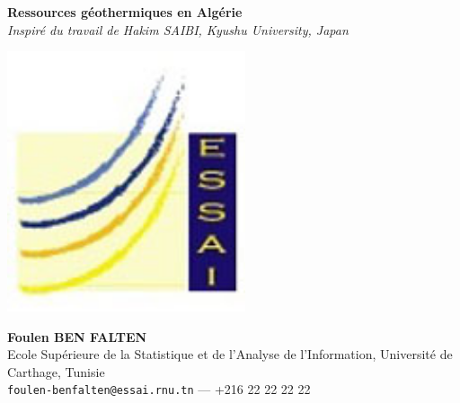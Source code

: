 \documentclass[a0, portrait]{a0poster}
\begin{document}


\begin{minipage}[b]{0.75\linewidth}
\VeryHuge \color{NavyBlue} \textbf{Ressources géothermiques en Algérie} \color{Black}\\[0.5cm]%
\Huge\textit{Inspiré du travail de Hakim SAIBI, Kyushu University, Japan}\\[0.5cm]%
\end{minipage}
%
\begin{minipage}[b]{0.25\linewidth}
\includegraphics[width=7cm]{logo-essai.jpg}
\end{minipage}

\begin{minipage}[b]{0.75\linewidth}
\huge \textbf{Foulen BEN FALTEN}\\[0.5cm] %
\Large Ecole Sup\'erieure de la Statistique et de l'Analyse de l'Information, Université de Carthage, Tunisie\\[0.4cm] %
\large \texttt{foulen-benfalten@essai.rnu.tn} --- +216 22 22 22 22\\
\end{minipage}


\vspace{1cm} %
\end{document}
